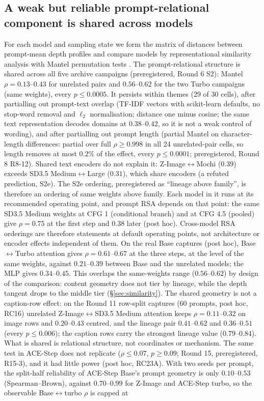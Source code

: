 \documentclass[11pt]{article}
\begin{document}
\subsection{A weak but reliable prompt-relational component is shared across models}
For each model and sampling state we form the matrix of distances between prompt-mean depth profiles and compare models by representational similarity analysis \citep{kriegeskorte2008representational} with Mantel permutation tests \citep{mantel1967detection}. The prompt-relational structure is shared across all five archive campaigns (preregistered, Round 6 S2): Mantel $\rho=0.13$--$0.43$ for unrelated pairs and $0.56$--$0.62$ for the two Turbo campaigns (same weights), every $p\le0.0005$. It persists within themes (29 of 30 cells), after partialling out prompt-text overlap (TF-IDF vectors with scikit-learn defaults, no stop-word removal and $\ell_2$ normalisation; distance one minus cosine; the same text representation decodes domains at $0.38$--$0.42$, so it is not a weak control of wording), and after partialling out prompt length (partial Mantel on character-length differences: partial over full $\rho\ge0.998$ in all 24 unrelated-pair cells, so length removes at most $0.2\%$ of the effect, every $p\le0.0001$; preregistered, Round 8 R8-12). Shared text encoders do not explain it: Z-Image$\leftrightarrow$Mochi ($0.39$) exceeds SD3.5 Medium$\leftrightarrow$Large ($0.31$), which share encoders (a refuted prediction, S2e). The S2e ordering, preregistered as ``lineage above family'', is therefore an ordering of same weights above family. Each model in it runs at its recommended operating point, and prompt RSA depends on that point: the same SD3.5 Medium weights at CFG 1 (conditional branch) and at CFG 4.5 (pooled) give $\rho=0.75$ at the first step and $0.38$ later (post hoc). Cross-model RSA orderings are therefore statements at default operating points, not architecture or encoder effects independent of them. On the real Base captures (post hoc), Base$\leftrightarrow$Turbo attention gives $\rho=0.61$--$0.67$ at the three steps, at the level of the same weights, against $0.21$--$0.39$ between Base and the unrelated models; the MLP gives $0.34$--$0.45$. This overlaps the same-weights range ($0.56$--$0.62$) by design of the comparison: content geometry does not tier by lineage, while the depth tangent drops to the middle tier (\S\ref{sec:similarity}). The shared geometry is not a caption-row effect: on the Round 11 row-split captures (60 prompts, post hoc, RC16) unrelated Z-Image$\leftrightarrow$SD3.5 Medium attention keeps $\rho=0.11$--$0.32$ on image rows and $0.20$--$0.43$ centred, and the lineage pair $0.41$--$0.62$ and $0.36$--$0.51$ (every $p\le0.006$); the caption rows carry the strongest lineage value ($0.79$--$0.84$). What is shared is relational structure, not coordinates or mechanism. The same test in ACE-Step does not replicate ($\rho\le0.07$, $p\ge0.09$; Round 15, preregistered, R15-3), and it had little power (post hoc, RC23A). With two seeds per prompt, the split-half reliability of ACE-Step Base's prompt geometry is only $0.10$--$0.53$ (Spearman--Brown), against $0.70$--$0.99$ for Z-Image and ACE-Step turbo, so the observable Base$\leftrightarrow$turbo $\rho$ is capped at 
\end{document}
